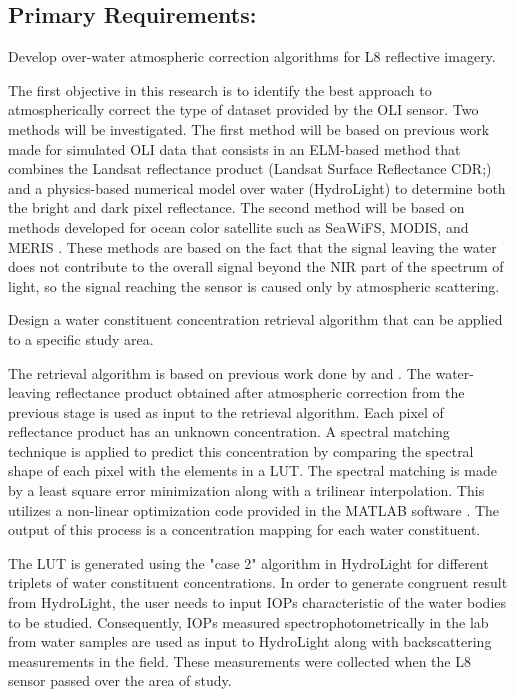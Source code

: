 \subsection{Primary Requirements:}
\begin{enumerate} 
	{\bf \item Develop over-water atmospheric correction algorithms for L8 reflective imagery.} 

The first objective in this research is to identify the best approach to atmospherically correct the type of dataset provided by the OLI sensor. Two methods will be investigated. The first method will be based on previous work made for simulated OLI data \cite{Gerace:2013,Gerace:2012,GeraceThesis,Pahlevan:2012} that consists in an ELM-based method that combines the Landsat reflectance product (Landsat Surface Reflectance CDR;\cite{LandsatCDR}) and a physics-based numerical model over water (HydroLight) to determine both the bright and dark pixel reflectance. The second method will be based on methods developed for ocean color satellite such as SeaWiFS, MODIS, and MERIS \cite{Gordon:1997}. These methods are based on the fact that the signal leaving the water does not contribute to the overall signal beyond the NIR part of the spectrum of light, so the signal reaching the sensor is caused only by atmospheric scattering.

	{\bf \item Design a water constituent concentration retrieval algorithm that can be applied to a specific study area.}

The retrieval algorithm is based on previous work done by \cite{Raqueno:2003} and \cite{GeraceThesis}. The water-leaving reflectance product obtained after atmospheric correction from the previous stage is used as input to the retrieval algorithm. Each pixel of reflectance product has an unknown concentration. A spectral matching technique is applied to predict this concentration by comparing the spectral shape of each pixel with the elements in a LUT. The spectral matching is made by a least square error minimization along with a trilinear interpolation. This utilizes a non-linear optimization code provided in the MATLAB software  . The output of this process is a concentration mapping for each water constituent.

The LUT is generated using the "case 2" { \color{red}  algorithm} in HydroLight for different triplets of water constituent concentrations. In order to generate congruent result from HydroLight, the user needs to input IOPs characteristic of the water bodies to be studied. Consequently, IOPs measured spectrophotometrically in the lab from water samples are used as input to HydroLight along with backscattering measurements in the field. These measurements were collected when the L8 sensor passed over the area of study.


\end{enumerate}
